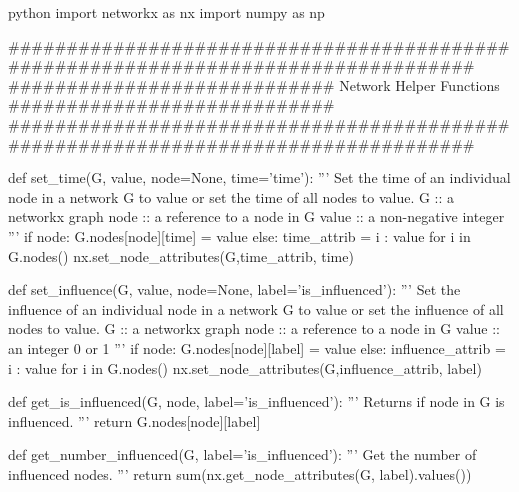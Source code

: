 \documentclass[10pt, oneside, reqno]{amsart}
\theoremstyle{plain}%
\theoremstyle{definition}
\theoremstyle{remark}
\begin{document}
\begin{mintedbox}{python}
import networkx as nx
import numpy as np

###################################################################################
############################ Network Helper Functions  ############################
###################################################################################

def set_time(G, value, node=None, time='time'):
    '''
        Set the time of an individual node in a network G 
        to value or set the time of all nodes to value.
        G      ::  a networkx graph
        node   ::  a reference to a node in G
        value  ::  a non-negative integer
    '''
    if node:
        G.nodes[node][time] = value
    else:
        time_attrib = {i : value for i in G.nodes()}
        nx.set_node_attributes(G,time_attrib, time)


def set_influence(G, value, node=None, label='is_influenced'):
    '''
        Set the influence of an individual node in a network G 
        to value or set the influence of all nodes to value.
        G      ::  a networkx graph
        node   ::  a reference to a node in G
        value  ::  an integer 0 or 1
    '''
    if node:
        G.nodes[node][label] = value
    else:
        influence_attrib = { i : value for i in G.nodes() }
        nx.set_node_attributes(G,influence_attrib, label)
        
def get_is_influenced(G, node, label='is_influenced'):
    '''
        Returns if node in G is influenced.
    '''
    return G.nodes[node][label]
        
def get_number_influenced(G, label='is_influenced'):
    '''
        Get the number of influenced nodes.
    '''
    return sum(nx.get_node_attributes(G, label).values())

\end{mintedbox}
\end{document}
